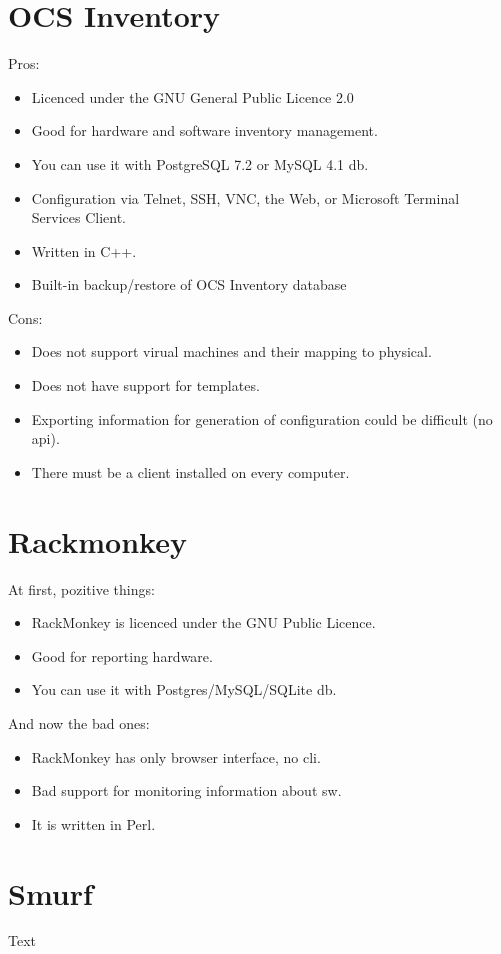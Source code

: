 \documentclass[12pt]{article}
\begin{document}
\section{OCS Inventory}
Pros:
\begin{itemize}
\item Licenced under the GNU General Public Licence 2.0
\item Good for hardware and software inventory management.
\item You can use it with PostgreSQL 7.2 or MySQL 4.1 db.
\item Configuration via Telnet, SSH, VNC, the Web, or Microsoft Terminal Services Client.
\item Written in C++.
\item Built-in backup/restore of OCS Inventory database
\end{itemize}


Cons:
\begin{itemize}
\item Does not support virual machines and their mapping to physical.
\item Does not have support for templates.
\item Exporting information for generation of configuration could be difficult (no api).
\item There must be a client installed on every computer.
\end{itemize}




\section{Rackmonkey}
At first, pozitive things:
\begin{itemize}
\item RackMonkey is licenced under the GNU Public Licence.
\item Good for reporting hardware.
\item You can use it with Postgres/MySQL/SQLite db.
\end{itemize}


And now the bad ones:
\begin{itemize}
\item RackMonkey has only browser interface, no cli.
\item Bad support for monitoring information about sw.
\item It is written in Perl.
\end{itemize}



\section{Smurf}
Text
\end{document}
